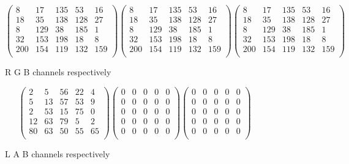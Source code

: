 \documentclass[12pt]{article}
\begin{document}
\begin{figure}[H]
\centering
\begin{equation*}
\begin{pmatrix}
8 & 17 & 135 & 53 & 16 \\
18 & 35 & 138 & 128 & 27 \\
8 & 129 & 38 & 185 & 1 \\
32 & 153 & 198 & 18 & 8 \\
200 & 154 & 119 & 132 & 159 \\
\end{pmatrix}
\begin{pmatrix}
8 & 17 & 135 & 53 & 16 \\
18 & 35 & 138 & 128 & 27 \\
8 & 129 & 38 & 185 & 1 \\
32 & 153 & 198 & 18 & 8 \\
200 & 154 & 119 & 132 & 159 \\
\end{pmatrix}
\begin{pmatrix}
8 & 17 & 135 & 53 & 16 \\
18 & 35 & 138 & 128 & 27 \\
8 & 129 & 38 & 185 & 1 \\
32 & 153 & 198 & 18 & 8 \\
200 & 154 & 119 & 132 & 159 \\
\end{pmatrix}
\end{equation*}
\caption{R G B channels respectively} %
\label{fig:kep4}
\end{figure}

\begin{figure}[H]
	\centering
	\begin{equation*}
	\begin{pmatrix}
	2 & 5 & 56 & 22 & 4 \\
	5 & 13 & 57 & 53 & 9 \\
	2 & 53 & 15 & 75 & 0 \\
	12 & 63 & 79 & 5 & 2 \\
	80 & 63 & 50 & 55 & 65 \\
	\end{pmatrix}
	\begin{pmatrix}
	0 & 0 & 0 & 0 & 0 \\
	0 & 0 & 0 & 0 & 0 \\
	0 & 0 & 0 & 0 & 0 \\
	0 & 0 & 0 & 0 & 0 \\
	0 & 0 & 0 & 0 & 0 \\
	\end{pmatrix}
	\begin{pmatrix}
	0 & 0 & 0 & 0 & 0 \\
	0 & 0 & 0 & 0 & 0 \\
	0 & 0 & 0 & 0 & 0 \\
	0 & 0 & 0 & 0 & 0 \\
	0 & 0 & 0 & 0 & 0 \\
	\end{pmatrix}
	\end{equation*}
	\caption{L A B channels respectively} %
	\label{fig:kep5}
\end{figure}
\end{document}
